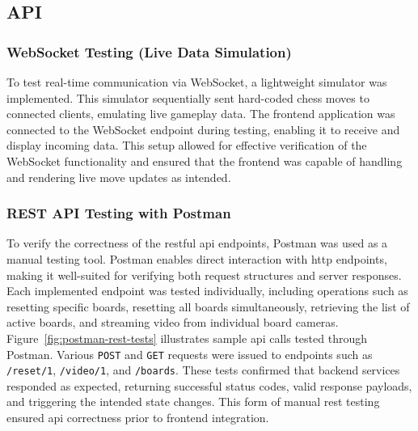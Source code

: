 \subsection{API}
\label{subsec:api-methods}

\subsubsection*{WebSocket Testing (Live Data Simulation)}
\label{subsubsec:websocket-methods}

To test real-time communication via WebSocket, a lightweight simulator was implemented. This simulator sequentially sent hard-coded chess moves to connected clients, emulating live gameplay data. The frontend application was connected to the WebSocket endpoint during testing, enabling it to receive and display incoming data. This setup allowed for effective verification of the WebSocket functionality and ensured that the frontend was capable of handling and rendering live move updates as intended.

\subsubsection*{REST API Testing with Postman}
\label{subsubsec:rest-api-methods}

To verify the correctness of the \gls{rest}ful \gls{api} endpoints, Postman was used as a manual testing tool. Postman enables direct interaction with \gls{http} endpoints, making it well-suited for verifying both request structures and server responses. Each implemented endpoint was tested individually, including operations such as resetting specific boards, resetting all boards simultaneously, retrieving the list of active boards, and streaming video from individual board cameras. \\

Figure~\ref{fig:postman-rest-tests} illustrates sample \gls{api} calls tested through Postman. Various \texttt{POST} and \texttt{GET} requests were issued to endpoints such as \texttt{/reset/1}, \texttt{/video/1}, and \texttt{/boards}. These tests confirmed that backend services responded as expected, returning successful status codes, valid response payloads, and triggering the intended state changes. This form of manual \gls{rest} testing ensured \gls{api} correctness prior to frontend integration.


